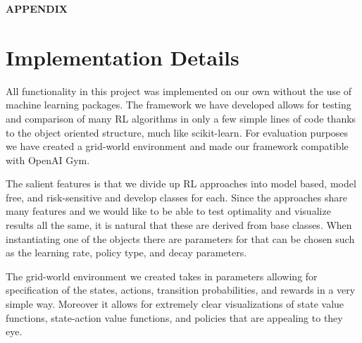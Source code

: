 \documentclass{article}
\begin{document}
\newpage
{\center\Large\bfseries APPENDIX\par}
\renewcommand\thesection{\Alph{section}}
\setcounter{section}{0}

\section{Implementation Details}\label{imp_appendix}
All functionality in this project was implemented on our own without the use of machine learning packages. The framework we have developed allows for testing and comparison of many RL algorithms in only a few simple lines of code thanks to the object oriented structure, much like scikit-learn. For evaluation purposes we have created a grid-world environment and made our framework compatible with OpenAI Gym. 

The salient features is that we divide up RL approaches into model based, model free, and risk-sensitive and develop classes for each. Since the approaches share many features and we would like to be able to test optimality and visualize results all the same, it is natural that these are derived from base classes. When instantiating one of the objects there are parameters for that can be chosen such as the learning rate, policy type, and decay parameters.

The grid-world environment we created takes in parameters allowing for specification of the states, actions, transition probabilities, and rewards in a very simple way. Moreover it allows for extremely clear visualizations of state value functions, state-action value functions, and policies that are appealing to they eye. 
\end{document}
